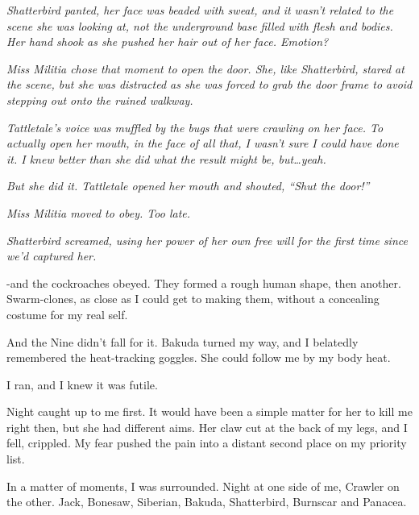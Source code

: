 \emph{Shatterbird panted, her face was beaded with sweat, and it wasn't related to the scene she was looking at, not the underground base filled with flesh and bodies.  Her hand shook as she pushed her hair out of her face.  Emotion?}



\emph{Miss Militia chose that moment to open the door.  She, like Shatterbird, stared at the scene, but she was distracted as she was forced to grab the door frame to avoid stepping out onto the ruined walkway.}



\emph{Tattletale's voice was muffled by the bugs that were crawling on her face.  To actually open her mouth, in the face of all that, I wasn't sure I could have done it.  I knew better than she did what the result might be, but\ldots yeah.}



\emph{But she did it.  Tattletale opened her mouth and shouted, ``Shut the door!''}



\emph{Miss Militia moved to obey.  Too late.}



\emph{Shatterbird screamed, using her power of her own free will for the first time since we'd captured her.}



\blacksquare



-and the cockroaches obeyed.  They formed a rough human shape, then another.  Swarm-clones, as close as I could get to making them, without a concealing costume for my real self.



And the Nine didn't fall for it.  Bakuda turned my way, and I belatedly remembered the heat-tracking goggles.  She could follow me by my body heat.



I ran, and I knew it was futile.



Night caught up to me first.  It would have been a simple matter for her to kill me right then, but she had different aims.  Her claw cut at the back of my legs, and I fell, crippled.  My fear pushed the pain into a distant second place on my priority list.



In a matter of moments, I was surrounded.  Night at one side of me, Crawler on the other.  Jack, Bonesaw, Siberian, Bakuda, Shatterbird, Burnscar and Panacea.




